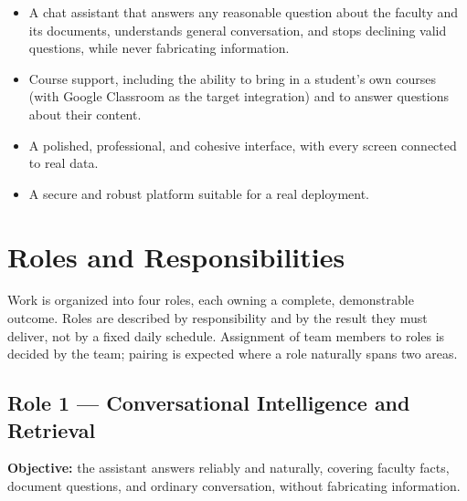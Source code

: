 \documentclass[11pt,a4paper]{article}
\begin{document}
\begin{itemize}
  \item A chat assistant that answers any reasonable question about the faculty and
        its documents, understands general conversation, and stops declining valid
        questions, while never fabricating information.
  \item Course support, including the ability to bring in a student's own courses
        (with Google Classroom as the target integration) and to answer questions
        about their content.
  \item A polished, professional, and cohesive interface, with every screen connected
        to real data.
  \item A secure and robust platform suitable for a real deployment.
\end{itemize}

\section{Roles and Responsibilities}

Work is organized into four roles, each owning a complete, demonstrable outcome. Roles
are described by responsibility and by the result they must deliver, not by a fixed
daily schedule. Assignment of team members to roles is decided by the team; pairing is
expected where a role naturally spans two areas.

\subsection{Role 1 --- Conversational Intelligence and Retrieval}
\textbf{Objective:} the assistant answers reliably and naturally, covering faculty
facts, document questions, and ordinary conversation, without fabricating information.
\end{document}
